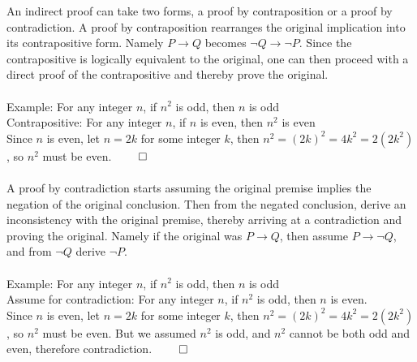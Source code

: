\documentclass[12pt]{article}
\newenvironment{problem}[2][Problem]{\begin{trivlist}
\item[\hskip \labelsep {\bfseries #1}\hskip \labelsep {\bfseries #2.}]}{\end{trivlist}}
\begin{document}
\begin{problem}{2}
An indirect proof can take two forms, a proof by contraposition or a proof by contradiction.
A proof by contraposition rearranges the original implication into its contrapositive form.
Namely $P \rightarrow Q$ becomes $\neg Q \rightarrow \neg P$. 
Since the contrapositive is logically equivalent to the original, one can then proceed with a direct proof of the contrapositive and thereby prove the original.\\
\\Example: For any integer $n$, if $n^2$ is odd, then $n$ is odd\\
Contrapositive: For any integer $n$, if $n$ is even, then $n^2$ is even\\
Since $n$ is even, let $n = 2k$ for some integer $k$, then $n^2 = (2k)^2 = 4k^2 = 2(2k^2)$, so $n^2$ must be even. $\qed$
\\\\A proof by contradiction starts assuming the original premise implies the negation of the original conclusion. 
Then from the negated conclusion, derive an inconsistency with the original premise, thereby arriving at a contradiction and proving the original.
Namely if the original was $P \rightarrow Q$, then assume $P \rightarrow \neg Q$, and from $\neg Q$ derive $\neg P$.\\
\\Example: For any integer $n$, if $n^2$ is odd, then $n$ is odd\\
Assume for contradiction: For any integer $n$, if $n^2$ is odd, then $n$ is even.\\
Since $n$ is even, let $n = 2k$ for some integer $k$, then $n^2 = (2k)^2 = 4k^2 = 2(2k^2)$, so $n^2$ must be even.
But we assumed $n^2$ is odd, and $n^2$ cannot be both odd and even, therefore contradiction. $\qed$\\\\
\end{problem}
 
\end{document}
